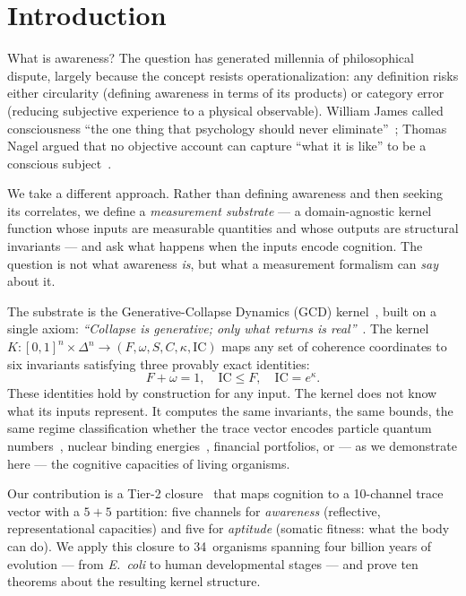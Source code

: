 \documentclass[
  aps,
  prd,
  twocolumn,
  superscriptaddress,
  nofootinbib,
  floatfix
]{revtex4-2}
\newcommand{\beq}{\begin{equation}}
\newcommand{\eeq}{\end{equation}}
\newcommand{\IC}{\mathrm{IC}}
\begin{document}
\section{Introduction}\label{sec:intro}

What is awareness?  The question has generated millennia
of philosophical dispute, largely because the concept resists
operationalization: any definition risks either circularity
(defining awareness in terms of its products) or category
error (reducing subjective experience to a physical observable).
William James called consciousness ``the one thing that
psychology should never
eliminate''~\cite{james1890principles}; Thomas Nagel
argued that no objective account can capture ``what it is
like'' to be a conscious subject~\cite{nagel1974bat}.

We take a different approach.  Rather than defining awareness
and then seeking its correlates, we define a \emph{measurement
substrate} --- a domain-agnostic kernel function whose inputs
are measurable quantities and whose outputs are structural
invariants --- and ask what happens when the inputs encode
cognition.  The question is not what awareness \emph{is}, but
what a measurement formalism can \emph{say} about it.

The substrate is the Generative-Collapse Dynamics (GCD)
kernel~\cite{paulus2025umcp,paulus2025physicscoherence},
built on a single axiom: \emph{``Collapse is generative;
only what returns is real''}~\cite{paulus2026umcpcasepack}.
The kernel $K\!: [0,1]^n \times \Delta^n
\to (F, \omega, S, C, \kappa, \IC)$ maps any set of coherence coordinates to
six invariants satisfying three provably exact identities:
\beq\label{eq:tier1}
  F + \omega = 1, \quad
  \IC \leq F, \quad
  \IC = e^{\kappa}.
\eeq
These identities hold by construction for any input.  The
kernel does not know what its inputs represent.  It computes
the same invariants, the same bounds, the same regime
classification whether the trace vector encodes particle
quantum numbers~\cite{paulus2026sm}, nuclear binding
energies~\cite{weizsacker1935,bethe1936}, financial
portfolios, or --- as we demonstrate here --- the
cognitive capacities of living organisms.

Our contribution is a Tier-2 closure~\cite{paulus2025umcp}
that maps cognition to a 10-channel trace vector with a
$5\!+\!5$ partition: five channels for \emph{awareness}
(reflective, representational capacities) and five for
\emph{aptitude} (somatic fitness: what the body can do).
We apply this closure to 34~organisms spanning four billion
years of evolution --- from \emph{E.~coli} to human
developmental stages --- and prove ten theorems about the
resulting kernel structure.
\end{document}
